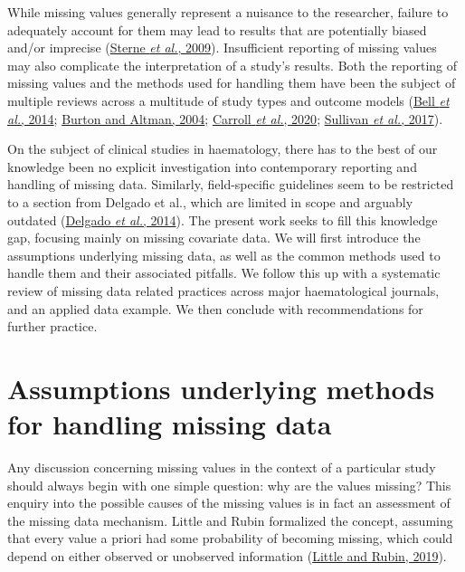 \documentclass[
  letterpaper,
  DIV=11,
  numbers=noendperiod]{scrreprt}
\begin{document}
While missing values generally represent a nuisance to the researcher,
failure to adequately account for them may lead to results that are
potentially biased and/or imprecise
(\protect\hyperlink{ref-sterneMultipleImputationMissing2009}{Sterne
\emph{et al.}, 2009}). Insufficient reporting of missing values may also
complicate the interpretation of a study's results. Both the reporting
of missing values and the methods used for handling them have been the
subject of multiple reviews across a multitude of study types and
outcome models (\protect\hyperlink{ref-bellHandlingMissingData2014}{Bell
\emph{et al.}, 2014};
\protect\hyperlink{ref-burtonMissingCovariateData2004}{Burton and
Altman, 2004}; \protect\hyperlink{ref-carrollHowAreMissing2020}{Carroll
\emph{et al.}, 2020};
\protect\hyperlink{ref-sullivanTreatmentMissingData2017}{Sullivan
\emph{et al.}, 2017}).

On the subject of clinical studies in haematology, there has to the best
of our knowledge been no explicit investigation into contemporary
reporting and handling of missing data. Similarly, field-specific
guidelines seem to be restricted to a section from Delgado et al., which
are limited in scope and arguably outdated
(\protect\hyperlink{ref-delgadoSurvivalAnalysisHematologic2014}{Delgado
\emph{et al.}, 2014}). The present work seeks to fill this knowledge
gap, focusing mainly on missing covariate data. We will first introduce
the assumptions underlying missing data, as well as the common methods
used to handle them and their associated pitfalls. We follow this up
with a systematic review of missing data related practices across major
haematological journals, and an applied data example. We then conclude
with recommendations for further practice.

\hypertarget{assumptions-underlying-methods-for-handling-missing-data}{%
\section{Assumptions underlying methods for handling missing
data}\label{assumptions-underlying-methods-for-handling-missing-data}}

Any discussion concerning missing values in the context of a particular
study should always begin with one simple question: why are the values
missing? This enquiry into the possible causes of the missing values is
in fact an assessment of the missing data mechanism. Little and Rubin
formalized the concept, assuming that every value a priori had some
probability of becoming missing, which could depend on either observed
or unobserved information
(\protect\hyperlink{ref-littleStatisticalAnalysisMissing2019}{Little and
Rubin, 2019}).
\end{document}
